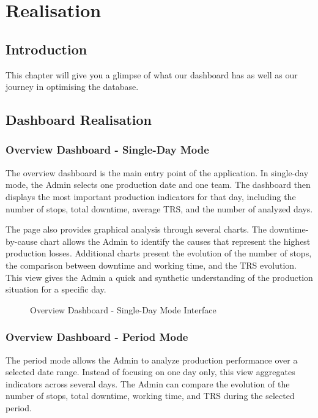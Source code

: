 \chapter{Realisation}

\section*{Introduction}

This chapter will give you a glimpse of what our dashboard has as well as our journey in optimising the database.

\section{Dashboard Realisation}

\subsection{Overview Dashboard - Single-Day Mode}

The overview dashboard is the main entry point of the application. In single-day mode, the Admin selects one production date and one team. The dashboard then displays the most important production indicators for that day, including the number of stops, total downtime, average TRS, and the number of analyzed days.

The page also provides graphical analysis through several charts. The downtime-by-cause chart allows the Admin to identify the causes that represent the highest production losses. Additional charts present the evolution of the number of stops, the comparison between downtime and working time, and the TRS evolution. This view gives the Admin a quick and synthetic understanding of the production situation for a specific day.

\begin{figure}[H]
\centering
{}
\caption{Overview Dashboard - Single-Day Mode Interface}
\label{fig:chapter3-1}
\end{figure}

\subsection{Overview Dashboard - Period Mode}

The period mode allows the Admin to analyze production performance over a selected date range. Instead of focusing on one day only, this view aggregates indicators across several days. The Admin can compare the evolution of the number of stops, total downtime, working time, and TRS during the selected period.

